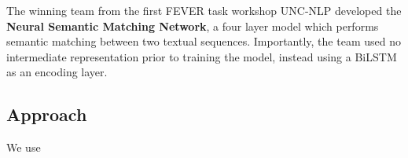 \documentclass[11pt,a4paper]{article}
\begin{document}
The winning team from the first FEVER task workshop UNC-NLP \citep{unc2018}
developed the \textbf{Neural Semantic Matching Network}, a four layer model
\footnotemark which performs semantic matching between two textual sequences.
Importantly, the team used no intermediate representation prior to training the
model, instead using a BiLSTM as an encoding layer.


\subsection{Approach}%
\label{subsec:nli-approach}

We use




\end{document}
